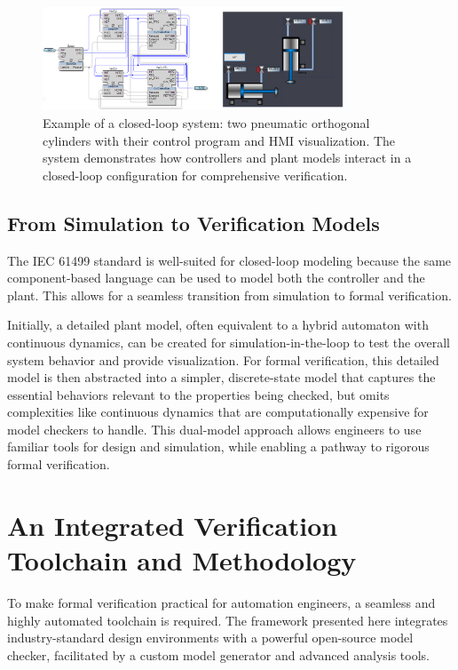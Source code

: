\begin{figure}[h]
\centering
\includegraphics[width=0.8\textwidth]{chapters/images/chapter2/wholesystem_withhmi.png}
\caption{Example of a closed-loop system: two pneumatic orthogonal cylinders with their control program and HMI visualization. The system demonstrates how controllers and plant models interact in a closed-loop configuration for comprehensive verification.}
\label{fig:closed_loop_example}
\end{figure}

\subsection{From Simulation to Verification Models}

The IEC 61499 standard is well-suited for closed-loop modeling because the same component-based language can be used to model both the controller and the plant. This allows for a seamless transition from simulation to formal verification.

Initially, a detailed plant model, often equivalent to a hybrid automaton with continuous dynamics, can be created for simulation-in-the-loop to test the overall system behavior and provide visualization. For formal verification, this detailed model is then abstracted into a simpler, discrete-state model that captures the essential behaviors relevant to the properties being checked, but omits complexities like continuous dynamics that are computationally expensive for model checkers to handle. This dual-model approach allows engineers to use familiar tools for design and simulation, while enabling a pathway to rigorous formal verification.

\section{An Integrated Verification Toolchain and Methodology}\label{sec:toolchain}

To make formal verification practical for automation engineers, a seamless and highly automated toolchain is required. The framework presented here integrates industry-standard design environments with a powerful open-source model checker, facilitated by a custom model generator and advanced analysis tools.

